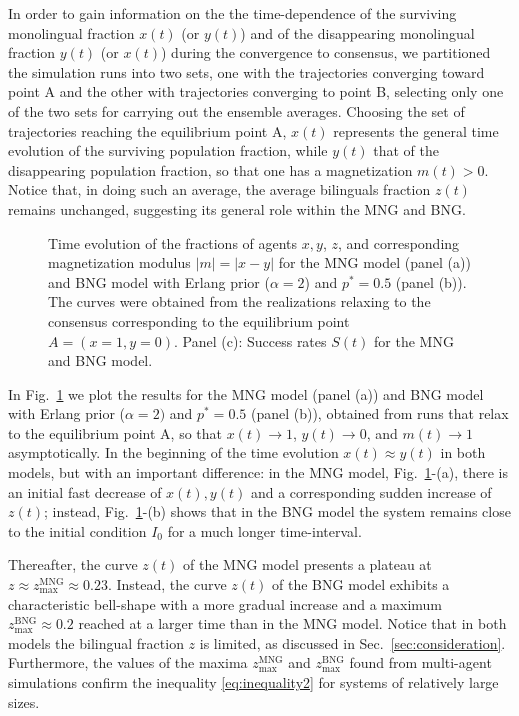 \documentclass[review]{elsarticle}
\newcommand{\zmax}{z_\mathrm{max}}
\newcommand{\+}{\! + \!}
\begin{document}
In order to gain information on the the time-dependence of the surviving monolingual fraction $x(t)$ (or $y(t)$) and of the disappearing monolingual fraction $y(t)$ (or $x(t)$) during the convergence to consensus, we partitioned the simulation runs into two sets, one with the trajectories converging toward point A and the other with trajectories converging to point B, selecting only one of the two sets for carrying out the ensemble averages.
Choosing the set of trajectories reaching the equilibrium point A, $x(t)$ represents the general time evolution of the surviving population fraction, while $y(t)$ that of the disappearing population fraction, so that one has a magnetization $m(t)>0$.
Notice that, in doing such an average, the average bilinguals fraction $z(t)$ remains unchanged, suggesting its general role within the MNG and BNG. 


\begin{figure}[ht!]
    \caption{
      Time evolution of the fractions of agents $x, y$, $z$, and corresponding magnetization modulus $|m|=|x-y|$ for the MNG model (panel (a))   and BNG model with Erlang prior ($\alpha=2$) and $ p^*= 0.5$ (panel (b)).
      The curves were obtained from the realizations relaxing to the consensus corresponding to the equilibrium point $A=(x=1, y=0)$.
      Panel (c): Success rates $S(t)$ for the MNG and BNG model.
    }
\label{fig:curvature}
\end{figure}



In Fig.~\ref{fig:curvature} we plot the results for the MNG model (panel (a)) and BNG model with Erlang prior ($\alpha=2)$ and $ p^*= 0.5$ (panel (b)), obtained from runs that relax to the equilibrium point A, so that $x(t) \to 1$, $y(t) \to 0$, and $m(t) \to 1$ asymptotically.
In the beginning of the time evolution $x(t) \approx y(t)$ in  both models, but with an important difference:
in the MNG model, Fig.~\ref{fig:curvature}-(a), there is an initial fast decrease of $x(t), y(t)$ and a corresponding sudden increase of $z(t)$;
instead, Fig.~\ref{fig:curvature}-(b) shows that in the BNG model the system remains close to the initial condition $I_0$ for a much longer time-interval.


Thereafter, the curve $z(t)$ of the MNG model presents a plateau at $z \approx \zmax^\mathrm{MNG} \approx 0.23$.
Instead, the curve $z(t)$ of the BNG model exhibits a characteristic bell-shape with a more gradual increase and a maximum $\zmax^\mathrm{BNG} \approx 0.2$ reached at a larger time than in the MNG model. 
Notice that in both models the bilingual fraction $z$ is limited, as discussed in Sec.~\ref{sec:consideration}.
Furthermore, the values of the maxima $\zmax^\mathrm{MNG}$ and $\zmax^\mathrm{BNG}$ found from multi-agent simulations confirm the inequality \eqref{eq:inequality2} for systems of relatively large sizes.
\end{document}
